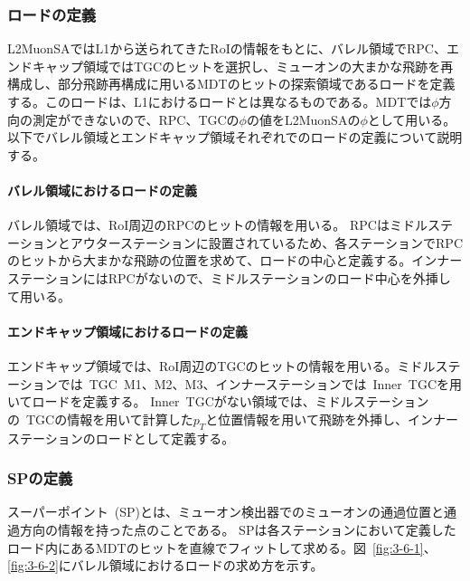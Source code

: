 \subsubsection{ロードの定義}
L2MuonSAではL1から送られてきたRoIの情報をもとに、バレル領域でRPC、エンドキャップ領域ではTGCのヒットを選択し、ミューオンの大まかな飛跡を再構成し、部分飛跡再構成に用いるMDTのヒットの探索領域であるロードを定義する。このロードは、L1におけるロードとは異なるものである。MDTでは$\phi$方向の測定ができないので、RPC、TGCの$\phi$の値をL2MuonSAの$\phi$として用いる。
以下でバレル領域とエンドキャップ領域それぞれでのロードの定義について説明する。

\paragraph{バレル領域におけるロードの定義}
バレル領域では、RoI周辺のRPCのヒットの情報を用いる。
RPCはミドルステーションとアウターステーションに設置されているため、各ステーションでRPCのヒットから大まかな飛跡の位置を求めて、ロードの中心と定義する。インナーステーションにはRPCがないので、ミドルステーションのロード中心を外挿して用いる。

\paragraph{エンドキャップ領域におけるロードの定義}
エンドキャップ領域では、RoI周辺のTGCのヒットの情報を用いる。ミドルステーションでは~TGC~M1、M2、M3、インナーステーションでは~Inner~TGCを用いてロードを定義する。
Inner~TGCがない領域では、ミドルステーションの~TGCの情報を用いて計算した$p_T$と位置情報を用いて飛跡を外挿し、インナーステーションのロードとして定義する。

\subsubsection{SPの定義}
スーパーポイント~(SP)とは、ミューオン検出器でのミューオンの通過位置と通過方向の情報を持った点のことである。
SPは各ステーションにおいて定義したロード内にあるMDTのヒットを直線でフィットして求める。図~\ref{fig:3-6-1}、\ref{fig:3-6-2}にバレル領域におけるロードの求め方を示す。

